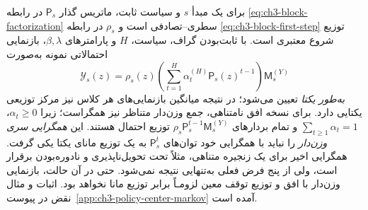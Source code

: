 برای یک مبدأ $s$ و سیاست
ثابت، ماتریس گذار
$\mathsf P_s$ در رابطه
\eqref{eq:ch3-block-factorization}
سطری--تصادفی است و
$\rho_s$ در رابطه
\eqref{eq:ch3-block-first-step}
توزیع شروع معتبری است.
با ثابت‌بودن گراف، سیاست،
$H$ و پارامترهای
$\beta,\lambda$، بازنمایی
احتمالاتی نمونه به‌صورت
\begin{equation}\label{eq:ch3-policy-center-unique-walk}
\boxed{
\mathscr Y_s(z)
=\rho_s(z)
\left(\sum_{t=1}^{H}
\alpha_t^{(H)}
\mathsf P_s(z)^{t-1}\right)
\mathsf M_s^{(Y)}
}
\end{equation}
\emph{به‌طور یکتا} تعیین
می‌شود؛ در نتیجه میانگین
بازنمایی‌های هر کلاس نیز
مرکز توزیعی یکتایی دارد.
برای نسخه افق نامتناهی،
جمع وزن‌دار متناظر نیز
همگراست؛ زیرا $\alpha_t\ge0$،
$\sum_{t\ge1}\alpha_t=1$
و تمام بردارهای
$\rho_s\mathsf P_s^{t-1}
\mathsf M_s^{(Y)}$
توزیع احتمال هستند.
این \emph{همگرایی سری
وزن‌دار} را نباید با
همگرایی خود توان‌های
$\mathsf P_s^t$
به یک توزیع مانای یکتا
یکی گرفت. همگرایی اخیر
برای یک زنجیره متناهی،
مثلاً تحت تحویل‌ناپذیری
و نادوره‌بودن برقرار است،
ولی از پنج فرض فعلی
به‌تنهایی نتیجه نمی‌شود.
حتی در آن حالت،
بازنمایی وزن‌دار با
افق و توزیع توقف معین
لزومـاً برابر توزیع مانا
نخواهد بود.
اثبات و مثال نقض
در پیوست~\ref{app:ch3-policy-center-markov}
آمده است.


